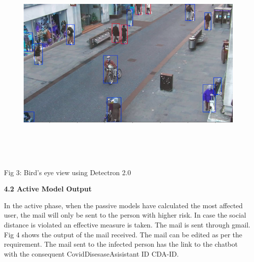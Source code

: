 \documentclass[12pt]{article}
\begin{document}

\begin{figure}[H]
	\begin{Center}
		\includegraphics[width=6.14in,height=4.0in]{./media/image7.png}
	\end{Center}
\end{figure}



\begin{justify}
 
\end{justify}
\begin{Center}
Fig 3: Bird’s eye view using Detectron 2.0
\end{Center}
\begin{justify}
 
\end{justify}

\vspace{\baselineskip}
\setlength{\parskip}{9.96pt}

\vspace{\baselineskip}
\setlength{\parskip}{12.0pt}
\setlength{\parskip}{9.96pt}
\setlength{\parskip}{12.0pt}
\begin{justify}
{\fontsize{14pt}{16.8pt}\selectfont \textbf{4.2 Active Model Output}}
\end{justify}
\begin{justify}
In the active phase, when the passive models have calculated the most affected user, the mail will only be sent to the person with higher risk. In case the social distance is violated an effective measure is taken. The mail is sent through gmail. Fig 4 shows the output of the mail received. The mail can be edited as per the requirement. The mail sent to the infected person has the link to the chatbot with the consequent CovidDisesaseAsisistant ID CDA-ID. 
\end{justify}
\begin{justify}
{\fontsize{14pt}{16.8pt}\selectfont \textbf{ }}
\end{justify}
\end{document}
